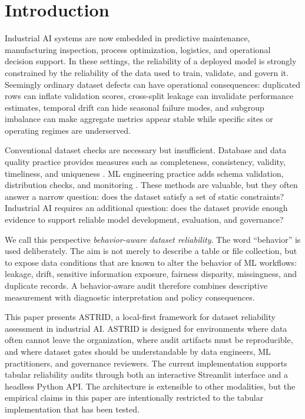 \documentclass[runningheads]{llncs}
\begin{document}
\section{Introduction}

Industrial AI systems are now embedded in predictive maintenance, manufacturing
inspection, process optimization, logistics, and operational decision support.
In these settings, the reliability of a deployed model is strongly constrained by
the reliability of the data used to train, validate, and govern it. Seemingly
ordinary dataset defects can have operational consequences: duplicated rows can
inflate validation scores, cross-split leakage can invalidate performance
estimates, temporal drift can hide seasonal failure modes, and subgroup imbalance
can make aggregate metrics appear stable while specific sites or operating regimes
are underserved.

Conventional dataset checks are necessary but insufficient. Database and data
quality practice provides measures such as completeness, consistency, validity,
timeliness, and uniqueness \cite{iso25012,schelter2018}. ML engineering practice
adds schema validation, distribution checks, and monitoring \cite{breck2019,
polyzotis2017}. These methods are valuable, but they often answer a narrow
question: does the dataset satisfy a set of static constraints? Industrial AI
requires an additional question: does the dataset provide enough evidence to
support reliable model development, evaluation, and governance?

We call this perspective \emph{behavior-aware dataset reliability}. The word
``behavior'' is used deliberately. The aim is not merely to describe a table or
file collection, but to expose data conditions that are known to alter the
behavior of ML workflows: leakage, drift, sensitive information exposure,
fairness disparity, missingness, and duplicate records. A behavior-aware audit
therefore combines descriptive measurement with diagnostic interpretation and
policy consequences.

This paper presents ASTRID, a local-first framework for dataset reliability
assessment in industrial AI. ASTRID is designed for environments where data often
cannot leave the organization, where audit artifacts must be reproducible, and
where dataset gates should be understandable by data engineers, ML practitioners,
and governance reviewers. The current implementation supports tabular reliability
audits through both an interactive Streamlit interface and a headless Python API.
The architecture is extensible to other modalities, but the empirical claims in
this paper are intentionally restricted to the tabular implementation that has
been tested.
\end{document}

